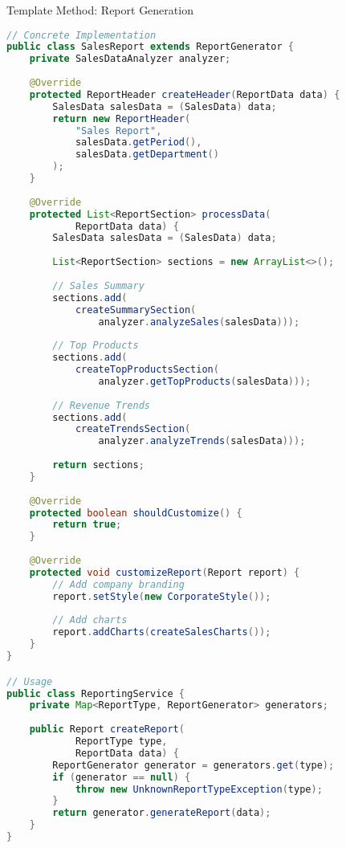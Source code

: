 \begin{example2}{Template Method: Report Generation}
\begin{lstlisting}[language=Java, style=basesmol]
// Concrete Implementation
public class SalesReport extends ReportGenerator {
    private SalesDataAnalyzer analyzer;
    
    @Override
    protected ReportHeader createHeader(ReportData data) {
        SalesData salesData = (SalesData) data;
        return new ReportHeader(
            "Sales Report",
            salesData.getPeriod(),
            salesData.getDepartment()
        );
    }
    
    @Override
    protected List<ReportSection> processData(
            ReportData data) {
        SalesData salesData = (SalesData) data;
        
        List<ReportSection> sections = new ArrayList<>();
        
        // Sales Summary
        sections.add(
            createSummarySection(
                analyzer.analyzeSales(salesData)));
                
        // Top Products
        sections.add(
            createTopProductsSection(
                analyzer.getTopProducts(salesData)));
                
        // Revenue Trends
        sections.add(
            createTrendsSection(
                analyzer.analyzeTrends(salesData)));
                
        return sections;
    }
    
    @Override
    protected boolean shouldCustomize() {
        return true;
    }
    
    @Override
    protected void customizeReport(Report report) {
        // Add company branding
        report.setStyle(new CorporateStyle());
        
        // Add charts
        report.addCharts(createSalesCharts());
    }
}

// Usage
public class ReportingService {
    private Map<ReportType, ReportGenerator> generators;
    
    public Report createReport(
            ReportType type, 
            ReportData data) {
        ReportGenerator generator = generators.get(type);
        if (generator == null) {
            throw new UnknownReportTypeException(type);
        }
        return generator.generateReport(data);
    }
}
\end{lstlisting}
\end{example2}

